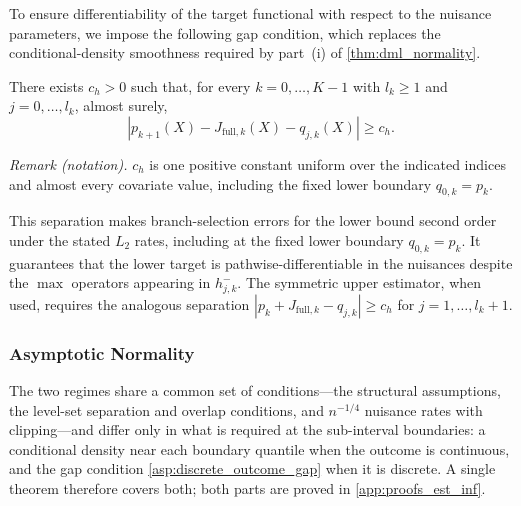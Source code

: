 To ensure differentiability of the target functional with respect to the nuisance parameters, we impose the following gap condition, which replaces the conditional-density smoothness required by part~\textup{(i)} of \cref{thm:dml_normality}.

\begin{assumption}\label{asp:discrete_outcome_gap}
    There exists $c_h>0$ such that, for every $k=0,\ldots,K-1$ with $l_k\geqslant1$ and $j=0,\ldots,l_k$, almost surely,
    \[
    \left|p_{k+1}(X)-J_{\mathrm{full},k}(X)-q_{j,k}(X)\right|\geqslant c_h.
    \]
\end{assumption}

\noindent\textit{Remark (notation).} $c_h$ is one positive constant uniform over the indicated indices and almost every covariate value, including the fixed lower boundary $q_{0,k}=p_k$.

This separation makes branch-selection errors for the lower bound second order under the stated $L_2$ rates, including at the fixed lower boundary $q_{0,k}=p_k$. It guarantees that the lower target is pathwise-differentiable in the nuisances despite the $\max$ operators appearing in $h_{j,k}^{-}$. The symmetric upper estimator, when used, requires the analogous separation $|p_k+J_{\mathrm{full},k}-q_{j,k}|\geqslant c_h$ for $j=1,\ldots,l_k+1$.

\subsubsection{Asymptotic Normality}\label{subsubsec:dml_normality}

The two regimes share a common set of conditions---the structural assumptions, the level-set separation and overlap conditions, and $n^{-1/4}$ nuisance rates with clipping---and differ only in what is required at the sub-interval boundaries: a conditional density near each boundary quantile when the outcome is continuous, and the gap condition \cref{asp:discrete_outcome_gap} when it is discrete. A single theorem therefore covers both; both parts are proved in \cref{app:proofs_est_inf}.

